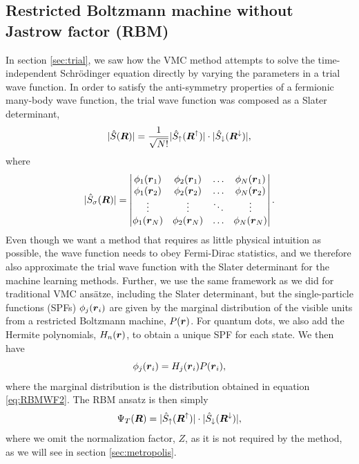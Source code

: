 \subsection{Restricted Boltzmann machine without Jastrow factor (RBM)} \label{sec:rbm}
In section \ref{sec:trial}, we saw how the VMC method attempts to solve the time-independent Schrödinger equation directly by varying the parameters in a trial wave function. In order to satisfy the anti-symmetry properties of a fermionic many-body wave function, the trial wave function was composed as a Slater determinant,
\begin{equation}
|\hat{S}(\boldsymbol{{R}})|=\frac{1}{\sqrt{N!}}|\hat{S}_{\uparrow}(\boldsymbol{{R}}^{\uparrow})|\cdot |\hat{S}_{\downarrow}(\boldsymbol{{R}}^{\downarrow})|,
\end{equation}
where
\begin{equation}
|\hat{S}_{\sigma}(\boldsymbol{{R}})|=
\begin{vmatrix}
\phi_1(\boldsymbol{r}_1) & \phi_2(\boldsymbol{r}_1) & \hdots & \phi_N(\boldsymbol{r}_1)\\
\phi_1(\boldsymbol{r}_2) & \phi_2(\boldsymbol{r}_2) & \hdots & \phi_N(\boldsymbol{r}_2)\\
\vdots & \vdots & \ddots & \vdots \\
\phi_1(\boldsymbol{r}_N) & \phi_2(\boldsymbol{r}_N) & \hdots & \phi_N(\boldsymbol{r}_N)
\end{vmatrix}.
\end{equation}
Even though we want a method that requires as little physical intuition as possible, the wave function needs to obey Fermi-Dirac statistics, and we therefore also approximate the trial wave function with the Slater determinant for the machine learning methods. Further, we use the same framework as we did for traditional VMC ansätze, including the Slater determinant, but the single-particle functions (SPFs) $\phi_j(\boldsymbol{{r}}_i)$ are given by the marginal distribution of the visible units from a restricted Boltzmann machine, $P(\boldsymbol{{r}})$. For quantum dots, we also add the Hermite polynomials, $H_n(\boldsymbol{{r}})$, to obtain a unique SPF for each state. We then have
\begin{equation}
\phi_j(\boldsymbol{{r}}_i)=H_j(\boldsymbol{{r}}_i)P(\boldsymbol{{r}}_i),
\end{equation}
where the marginal distribution is the distribution obtained in equation \eqref{eq:RBMWF2}. The RBM ansatz is then simply
\begin{equation}
\Psi_T(\boldsymbol{{R}})=|\hat{S}_{\uparrow}(\boldsymbol{{R}}^{\uparrow})|\cdot |\hat{S}_{\downarrow}(\boldsymbol{{R}}^{\downarrow})|,
\end{equation}
where we omit the normalization factor, $Z$, as it is not required by the method, as we will see in section \ref{sec:metropolis}.

